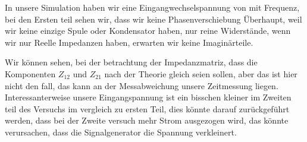 %
%
%
%
In unsere Simulation haben wir eine Eingangwechselspannung von  mit Frequenz, bei den Ersten teil sehen wir, dass wir keine Phasenverschiebung Überhaupt, weil wir keine einzige Spule oder Kondensator haben, nur reine Widerstände, wenn wir nur Reelle Impedanzen haben, erwarten wir keine Imaginärteile.

Wir können sehen, bei der betrachtung der Impedanzmatriz, dass die Komponenten $Z_12$ und $Z_21$ nach der Theorie gleich seien sollen, aber das ist hier nicht den fall, das kann an der Messabweichung unsere Zeitmessung liegen. Interessanterweise unsere Eingangspannung ist ein bisschen kleiner im Zweiten teil des Versuchs im vergleich zu ersten Teil, dies könnte darauf zurückgeführt werden, dass bei der Zweite versuch mehr Strom ausgezogen wird, das könnte verursachen, dass die Signalgenerator die Spannung verkleinert. 

%
\begin{flushright}
  \textit{\autorA}
\end{flushright}
%
%
%
%